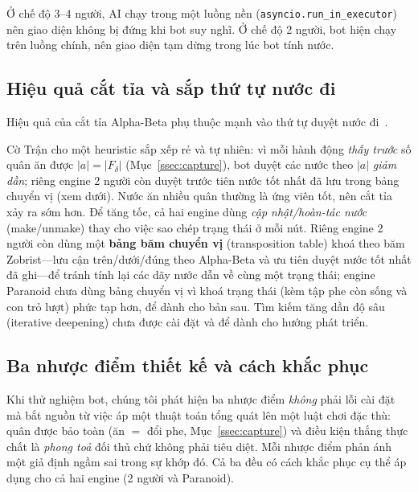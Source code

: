 Ở chế độ 3--4 người, AI chạy trong một luồng nền
(\texttt{asyncio.run\_in\_executor}) nên giao diện không bị đứng khi bot
suy nghĩ. Ở chế độ 2 người, bot hiện chạy trên luồng chính, nên giao diện
tạm dừng trong lúc bot tính nước.

\subsection{Hiệu quả cắt tỉa và sắp thứ tự nước đi}
\label{ssec:ordering}

Hiệu quả của cắt tỉa Alpha-Beta phụ thuộc mạnh vào thứ tự duyệt nước
đi~\citep{knuth1975alphabeta}.

Cờ Trận cho một heuristic sắp xếp rẻ và tự nhiên: vì mỗi hành
động \emph{thấy trước} số quân ăn được $|a|=|F_\delta|$
(Mục~\ref{ssec:capture}), bot duyệt các nước theo $|a|$ \emph{giảm dần}; riêng engine 2 người
còn duyệt trước tiên nước tốt nhất đã lưu trong bảng chuyển vị (xem dưới).
Nước ăn nhiều quân thường là ứng viên tốt, nên cắt tỉa xảy ra sớm hơn. Để
tăng tốc, cả hai engine dùng \emph{cập nhật/hoàn-tác nước} (make/unmake) thay cho việc sao
chép trạng thái ở mỗi nút. Riêng engine 2 người còn dùng một \textbf{bảng
băm chuyển vị} (transposition table) khoá theo băm Zobrist---lưu cận
trên/dưới/đúng theo Alpha-Beta và ưu tiên duyệt nước tốt nhất đã ghi---để
tránh tính lại các dãy nước dẫn về cùng một trạng thái; engine Paranoid
chưa dùng bảng chuyển vị vì khoá trạng thái (kèm tập phe còn sống và con
trỏ lượt) phức tạp hơn, để dành cho bản sau. Tìm kiếm tăng dần độ sâu
(iterative deepening) chưa được cài đặt và để dành cho hướng phát triển.

\subsection{Ba nhược điểm thiết kế và cách khắc phục}
\label{ssec:pitfalls}

Khi thử nghiệm bot, chúng tôi phát hiện ba nhược điểm \emph{không} phải lỗi
cài đặt mà bắt nguồn từ việc áp một thuật toán tổng quát lên một luật chơi
đặc thù: quân được bảo toàn (ăn $=$ đổi phe, Mục~\ref{ssec:capture}) và
điều kiện thắng thực chất là \emph{phong toả} đối thủ chứ không phải tiêu
diệt. Mỗi nhược điểm phản ánh một giả định ngầm sai trong sự khớp đó. Cả
ba đều có cách khắc phục cụ thể áp dụng cho cả hai engine (2 người và
Paranoid).

